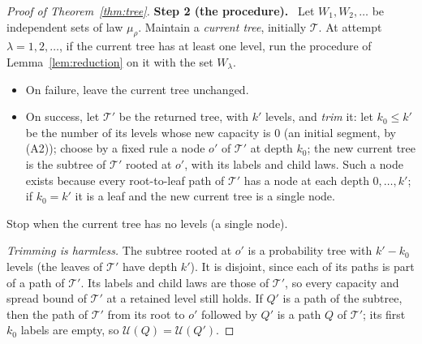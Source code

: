 \documentclass[11pt]{article}
\numberwithin{equation}{section}
\newcommand{\TT}{\mathcal T}
\newcommand{\UU}{\mathcal U}
\newcommand{\step}[2]{\par\medskip\noindent\textbf{Step #1 (#2).}\ }
\begin{document}
\begin{proof}[Proof of Theorem~\ref{thm:tree}]
\step{2}{the procedure}
Let $W_1,W_2,\ldots$ be independent sets of law $\mu_\rho$. Maintain a
\emph{current tree}, initially $\TT$. At attempt $\lambda=1,2,\ldots$,
if the current tree has at least one level, run the procedure of
Lemma~\ref{lem:reduction} on it with the set $W_\lambda$.
\begin{itemize}[leftmargin=1.6em,itemsep=2pt]
 \item On failure, leave the current tree unchanged.
 \item On success, let $\TT'$ be the returned tree, with $k'$ levels,
 and \emph{trim} it: let $k_0\le k'$ be the number of its levels whose
 new capacity is $0$ (an initial segment, by (A2)); choose by a fixed
 rule a node $o'$ of $\TT'$ at depth $k_0$; the new current tree is the
 subtree of $\TT'$ rooted at $o'$, with its labels and child laws. Such
 a node exists because every root-to-leaf path of $\TT'$ has a node at
 each depth $0,\ldots,k'$; if $k_0=k'$ it is a leaf and the new current
 tree is a single node.
\end{itemize}
Stop when the current tree has no levels (a single node).

\emph{Trimming is harmless.} The subtree rooted at $o'$ is a probability
tree with $k'-k_0$ levels (the leaves of $\TT'$ have depth $k'$). It is
disjoint, since each of its paths is part of a path of $\TT'$. Its
labels and child laws are those of $\TT'$, so every capacity and spread
bound of $\TT'$ at a retained level still holds. If $Q'$ is a path of
the subtree, then the path of $\TT'$ from its root to $o'$ followed by
$Q'$ is a path $Q$ of $\TT'$; its first $k_0$ labels are empty, so
$\UU(Q)=\UU(Q')$.


\end{proof}
\end{document}
